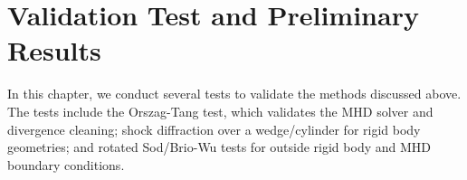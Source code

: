 
\chapter{Validation Test and Preliminary Results}  %

\ifpdf
    \graphicspath{{Chapter4/Figs/Raster/}{Chapter4/Figs/PDF/}{Chapter4/Figs/}}
\else
    \graphicspath{{Chapter4/Figs/Vector/}{Chapter4/Figs/}}
\fi

\label{chapter 4}


In this chapter, we conduct several tests to validate the methods discussed above. The tests include the Orszag-Tang test, which validates the MHD solver and divergence cleaning; shock diffraction over a wedge/cylinder for rigid body geometries; and rotated Sod/Brio-Wu tests for outside rigid body and MHD boundary conditions.
